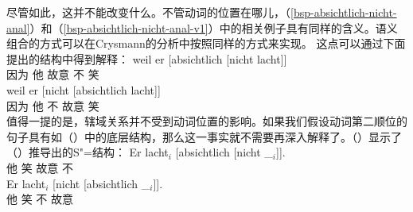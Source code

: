 \begin{enumerate}
{\z
尽管如此，这并不能改变什么。不管动词的位置在哪儿，（\ref{bsp-absichtlich-nicht-anal}）和（\ref{bsp-absichtlich-nicht-anal-v1}）中的相关例子具有同样的含义。语义组合的方式可以在Crysmann的分析中按照同样的方式来实现。
}
这点可以通过下面提出的结构中得到解释：
\eal
\label{bsp-absichtlich-nicht-anal}
\ex 
\gll weil er [absichtlich [nicht lacht]]\\
	 因为 他 \spacebr{}故意 \spacebr{}不 笑\\
\ex 
\gll weil er [nicht [absichtlich lacht]]\\
     因为 他 \spacebr{}不 \spacebr{}故意 笑\\
\zl
值得一提的是，辖域关系并不受到动词位置的影响。如果我们假设动词第二顺位的句子具有如（）中的底层结构，那么这一事实就不需要再深入解释了。（）显示了（）推导出的S"=结构：
\eal
\label{bsp-absichtlich-nicht-anal-v1}
\ex 
\gll Er lacht$_i$ [absichtlich [nicht \_$_i$]].\\
     他 笑 \spacebr{}故意 \spacebr{}不\\
\ex 
\gll Er lacht$_i$  [nicht [absichtlich \_$_i$]].\\
     他 笑 \spacebr{}不 \spacebr{}故意\\
\zl{}
\nocite{Hoehle88a,Hoehle97a}
\end{enumerate}

